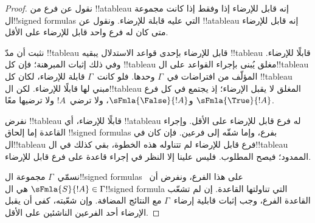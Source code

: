 \documentclass[../../../include/open-logic-section]{subfiles}
\begin{document}
\begin{proof}
نقول عن فرع من !!a{tableau} إنه قابل للإرضاء إذا وفقط إذا كانت
مجموعة ال!!{signed formula}s التي عليه قابلة للإرضاء.
ونقول عن !!a{tableau} إنه قابل للإرضاء متى كان له فرع واحد
قابل للإرضاء على الأقل.

نثبت أن مدّ !!{tableau} قابل للإرضاء بإحدى قواعد الاستدلال
يبقيه !!{tableau} قابلًا للإرضاء. وفي ذلك إثبات المبرهنة؛
فإن كل !!{tableau} مغلق يُبنى بإجراء القواعد على ال!!{tableau}
المؤلّف من افتراضات في~$\Gamma$ وحدها. فلو كانت~$\Gamma$ قابلة
للإرضاء، لكان كل !!{tableau} مبني لها قابلًا للإرضاء.
لكن ال!!{tableau} المغلق لا يقبل الإرضاء؛ إذ يجتمع في كل فرع
$\sFmla{\True}{!A}$ و$\sFmla{\False}{!A}$، ولا
 ترضي~$!A$ ولا ترضيها معًا.

نفرض !!{tableau} قابلًا للإرضاء، أي !!a{tableau} له فرع قابل
للإرضاء على الأقل. وإجراء القاعدة إما إلحاق !!{signed formula}s
بفرع، وإما شقّه إلى فرعين. فإن كان في ال!!{tableau} فرع قابل
للإرضاء لم تتناوله هذه الخطوة، بقي كذلك في ال!!{tableau} الممدود؛
فيصح المطلوب. فليس علينا إلا النظر في إجراء قاعدة على فرع قابل
للإرضاء.

نسمّي~$\Gamma$ مجموعة ال!!{signed formula}s على هذا الفرع،
ونفرض أن~$\sFmla{S}{!A} \in \Gamma$ هي ال!!{signed formula}
التي تناولتها القاعدة. إن لم تشعّب القاعدة الفرع، وجب إثبات
قابلية إرضاء~$\Gamma$ مع النتائج المضافة. وإن شعّبته،
كفى أن يقبل الإرضاء أحد الفرعين الناشئين على الأقل.


\end{proof}
\end{document}

